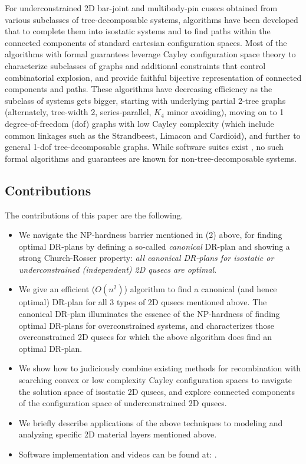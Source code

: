  
\medskip\noindent{}
For underconstrained 2D bar-joint and multibody-pin cusecs obtained from various subclasses of tree-decomposable systems, algorithms have been developed \cite{XX, XX} that 
to complete them into isostatic systems \cite{XX, XX} and to find paths within the connected components \cite{XX,XX} of
standard cartesian configuration spaces. Most of the algorithms with formal guarantees leverage Cayley configuration space theory \cite{XX,XX}
to characterize subclasses of graphs and additional constraints that control combinatorial explosion, and provide faithful bijective representation 
of connected components and paths.
These algorithms have decreasing efficiency as the subclass of systems gets bigger, starting with
underlying partial 2-tree graphs (alternately, tree-width 2, series-parallel, $K_4$ minor avoiding),  moving on   
to 1 degree-of-freedom (dof) graphs with low Cayley complexity (which include common linkages such as the Strandbeest, Limacon and Cardioid), 
and further to general 1-dof tree-decomposable graphs. 
While software suites exist \cite{XX,XX}, no such formal algorithms and guarantees are known for non-tree-decomposable systems.
%
\subsection{Contributions}
\label{sec:cont}
The contributions of this paper are the following.
\begin{itemize}
\item
We  navigate the NP-hardness barrier mentioned in (2) above, for finding optimal DR-plans by defining a 
so-called {\it canonical} DR-plan and showing a strong Church-Rosser property: {\it all canonical DR-plans for isostatic or underconstrained (independent) 
2D qusecs are optimal}. 
\item
We give an efficient ($O(n^2)$) algorithm to find a canonical (and hence optimal) DR-plan for all 3 types of 2D qusecs mentioned above.
The canonical DR-plan  
illuminates the essence of the NP-hardness of finding optimal DR-plans for overconstrained systems, and characterizes those 
overconstrained 2D qusecs for which the above algorithm does find an optimal DR-plan. 
\item
We show how to judiciously combine 
existing methods for recombination with searching  convex or low complexity Cayley configuration spaces to  navigate the solution space of isostatic 2D qusecs, and
explore connected components of the configuration space of underconstrained 2D qusecs. 
\item
We briefly describe applications of the above techniques to modeling and analyzing specific 2D material layers mentioned above.
\item
Software implementation and videos can be found at: .
\end{itemize}

